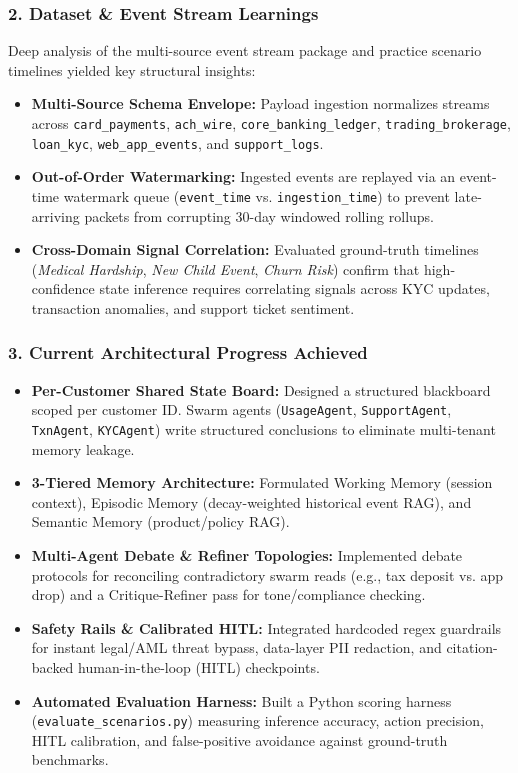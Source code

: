 \documentclass[10pt,a4paper]{article}
\begin{document}
\subsubsection*{\color{primary} 2. Dataset \& Event Stream Learnings}
Deep analysis of the multi-source event stream package and practice scenario timelines yielded key structural insights:
\begin{itemize}
    \item \textbf{Multi-Source Schema Envelope:} Payload ingestion normalizes streams across \texttt{card\_payments}, \texttt{ach\_wire}, \texttt{core\_banking\_ledger}, \texttt{trading\_brokerage}, \texttt{loan\_kyc}, \texttt{web\_app\_events}, and \texttt{support\_logs}.
    \item \textbf{Out-of-Order Watermarking:} Ingested events are replayed via an event-time watermark queue (\texttt{event\_time} vs. \texttt{ingestion\_time}) to prevent late-arriving packets from corrupting 30-day windowed rolling rollups.
    \item \textbf{Cross-Domain Signal Correlation:} Evaluated ground-truth timelines (\textit{Medical Hardship}, \textit{New Child Event}, \textit{Churn Risk}) confirm that high-confidence state inference requires correlating signals across KYC updates, transaction anomalies, and support ticket sentiment.
\end{itemize}

\subsubsection*{\color{primary} 3. Current Architectural Progress Achieved}
\begin{itemize}
    \item \textbf{Per-Customer Shared State Board:} Designed a structured blackboard scoped per customer ID. Swarm agents (\texttt{UsageAgent}, \texttt{SupportAgent}, \texttt{TxnAgent}, \texttt{KYCAgent}) write structured conclusions to eliminate multi-tenant memory leakage.
    \item \textbf{3-Tiered Memory Architecture:} Formulated Working Memory (session context), Episodic Memory (decay-weighted historical event RAG), and Semantic Memory (product/policy RAG).
    \item \textbf{Multi-Agent Debate \& Refiner Topologies:} Implemented debate protocols for reconciling contradictory swarm reads (e.g., tax deposit vs. app drop) and a Critique-Refiner pass for tone/compliance checking.
    \item \textbf{Safety Rails \& Calibrated HITL:} Integrated hardcoded regex guardrails for instant legal/AML threat bypass, data-layer PII redaction, and citation-backed human-in-the-loop (HITL) checkpoints.
    \item \textbf{Automated Evaluation Harness:} Built a Python scoring harness (\texttt{evaluate\_scenarios.py}) measuring inference accuracy, action precision, HITL calibration, and false-positive avoidance against ground-truth benchmarks.
\end{itemize}
\end{document}
